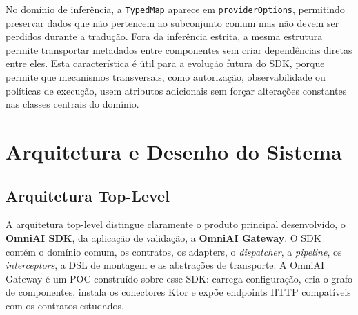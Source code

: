\documentclass[11pt,a4paper]{report}
\begin{document}
    No domínio de inferência, a \texttt{TypedMap} aparece em \texttt{providerOptions}, permitindo preservar dados que não pertencem ao subconjunto comum mas não devem ser perdidos durante a tradução. Fora da inferência estrita, a mesma estrutura permite transportar metadados entre componentes sem criar dependências diretas entre eles. Esta característica é útil para a evolução futura do SDK, porque permite que mecanismos transversais, como autorização, observabilidade ou políticas de execução, usem atributos adicionais sem forçar alterações constantes nas classes centrais do domínio.

    \chapter{Arquitetura e Desenho do Sistema}

    \section{Arquitetura Top-Level}
    A arquitetura top-level distingue claramente o produto principal desenvolvido, o \textbf{OmniAI SDK}, da aplicação de validação, a \textbf{OmniAI Gateway}. O SDK contém o domínio comum, os contratos, os adapters, o \textit{dispatcher}, a \textit{pipeline}, os \textit{interceptors}, a DSL de montagem e as abstrações de transporte. A OmniAI Gateway é um POC construído sobre esse SDK: carrega configuração, cria o grafo de componentes, instala os conectores Ktor e expõe endpoints HTTP compatíveis com os contratos estudados.
\end{document}
